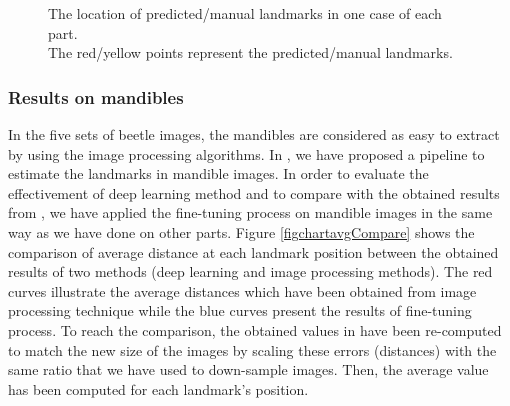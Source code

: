 \documentclass[review]{elsarticle}
\begin{document}
\begin{figure}[h!]
    \centering
    \caption{The location of predicted/manual landmarks in one case of each part.\\The red/yellow points represent the predicted/manual landmarks.}
    \label{figpdl}
\end{figure}

\pagebreak
\subsubsection{Results on mandibles}
In the five sets of beetle images, the mandibles are considered as easy to extract by using the image processing algorithms. In \cite{le2017maelab}, we have proposed a pipeline to estimate the landmarks in mandible images. In order to evaluate the effectivement of deep learning method and to compare with the obtained results from \cite{le2017maelab}, we have applied the fine-tuning process on mandible images in the same way as we have done on other parts. Figure \ref{figchartavgCompare} shows the comparison of average distance at each landmark position between the obtained results of two methods (deep learning and image processing methods). The red curves illustrate the average distances which have been obtained from image processing technique while the blue curves present the results of fine-tuning process. To reach the comparison, the obtained values in \cite{le2017maelab} have been re-computed to match the new size of the images by scaling these errors (distances) with the same ratio that we have used to down-sample images. Then, the average value has been computed for each landmark’s position.
\end{document}
